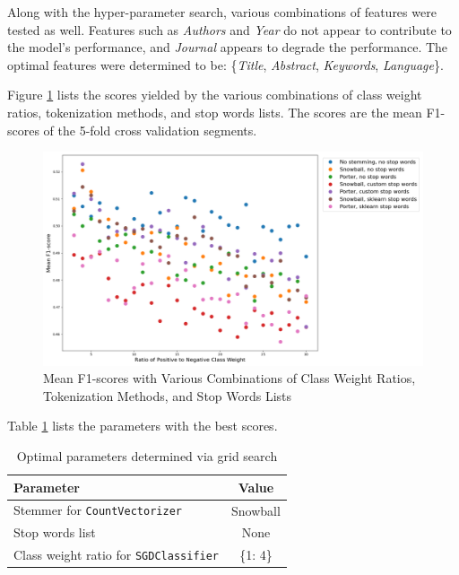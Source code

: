 \documentclass[11pt]{article}
\begin{document}
Along with the hyper-parameter search, various combinations of features were tested as well. Features such as \textit{Authors} and \textit{Year} do not appear to contribute to the model's performance, and \textit{Journal} appears to degrade the performance. The optimal features were determined to be: \{\textit{Title}, \textit{Abstract}, \textit{Keywords}, \textit{Language}\}.

Figure \ref{fig:cv} lists the scores yielded by the various combinations of class weight ratios, tokenization methods, and stop words lists. The scores are the mean F1-scores of the 5-fold cross validation segments.

\begin{figure}[!ht]
    \includegraphics[scale=0.46]{statics/cv.png}
    \centering
    \caption{Mean F1-scores with Various Combinations of Class Weight Ratios, Tokenization Methods, and Stop Words Lists}
    \label{fig:cv}
\end{figure}

Table \ref{table:gs1_param} lists the parameters with the best scores.
\begin{table}[!ht]
    \caption{Optimal parameters determined via grid search}
    \label{table:gs1_param}
    \begin{center}

        \begin{tabular}{| l | c |}
        \hline
        \textbf{Parameter} & \textbf{Value}
        \\ \hline
        Stemmer for \texttt{CountVectorizer} & Snowball
        \\ \hline
        Stop words list & None
        \\ \hline
        Class weight ratio for \texttt{SGDClassifier} & \{1: 4\}
        \\ \hline
        \end{tabular}

    \end{center}

\end{table}
\end{document}
